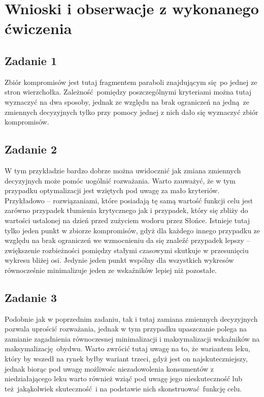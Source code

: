 \documentclass[a4paper, 12pt]{article}
\begin{document}
    \section{Wnioski i obserwacje z wykonanego ćwiczenia}
        \subsection{Zadanie 1}
            Zbiór kompromisów jest tutaj fragmentem paraboli znajdującym się po jednej ze stron 
            wierzchołka. Zależność pomiędzy poszczególnymi kryteriami można tutaj wyznaczyć na 
            dwa sposoby, jednak ze względu na brak ograniczeń na jedną ze zmiennych decyzyjnych
            tylko przy pomocy jednej z nich dało się wyznaczyć zbiór kompromisów.
        \subsection{Zadanie 2}
            W tym przykładzie bardzo dobrze można uwidocznić jak zmiana zmiennych decyzyjnych może 
            pomóc uogólnić rozważania. Warto zauważyć, że w tym przypadku optymalizacji jest wziętych
            pod uwagę za mało kryteriów. Przykładowo -- rozwiązaniami, które posiadają tę samą wartość
            funkcji celu jest zarówno przypadek tłumienia krytycznego jak i przypadek, który się zbliży
            do wartości ustalonej na dzień przed zużyciem wodoru przez Słońce. Istnieje tutaj tylko
            jeden punkt w zbiorze kompromisów, gdyż dla każdego innego przypadku ze względu na brak
            ograniczeń we wzmocnieniu da się znaleźć przypadek lepszy -- zwiększenie rozbieżności 
            pomiędzy stałymi czasowymi skutkuje w przesunięciu wykresu bliżej osi. Jedynie jeden 
            punkt wspólny dla wszystkich wykresów równocześnie minimalizuje jeden ze wskaźników lepiej
            niż pozostałe. 
        \subsection{Zadanie 3}
            Podobnie jak w poprzednim zadaniu, tak i tutaj zamiana zmiennych decyzyjnych pozwala
            uprościć rozważania, jednak w tym przypadku upaszczanie polega na zamianie zagadnienia
            równoczesnej minimalizacji i maksymalizacji wskaźników na maksymalizację obydwu. Warto
            zwrócić tutaj uwagę na to, że wariantem leku, który by wszedł na rynek byłby wariant 
            trzeci, gdyż jest on najskuteczniejszy, jednak biorąc pod uwagę możliwośc niezadowolenia
            konsumentów z niedziałającego leku warto również wziąć pod uwagę jego nieskuteczność 
            lub też jakąkolwiek skuteczność i na podstawie nich skonstruować funkcję celu.
\end{document}
